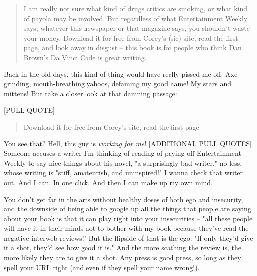 \begin{enumerate}
  
  \begin{quote}
  I am really not sure what kind of drugs critics are smoking, or
  what kind of payola may be involved. But regardless of what
  Entertainment Weekly says, whatever this newspaper or that magazine
  says, you shouldn't waste your money. Download it for free from
  Corey's (sic) site, read the first page, and look away in disgust
  -- this book is for people who think Dan Brown's Da Vinci Code is
  great writing.
  \end{quote}
  
  Back in the old days, this kind of thing would have really pissed
  me off. Axe-grinding, mouth-breathing yahoos, defaming my good
  name! My stars and mittens! But take a closer look at that damning
  passage:
  
  [PULL-QUOTE]
  
  \begin{quote}
  Download it for free from Corey's site, read the first page
  \end{quote}
  
  You see that? Hell, this guy is \emph{working for me}!
  [ADDITIONAL PULL QUOTES] Someone accuses a writer I'm thinking of
  reading of paying off Entertainment Weekly to say nice things about
  his novel, "a surprisingly bad writer," no less, whose writing is
  "stiff, amateurish, and uninspired!" I wanna check that writer out.
  And I can. In one click. And then I can make up my own mind.
  
  You don't get far in the arts without healthy doses of both ego and
  insecurity, and the downside of being able to google up all the
  things that people are saying about your book is that it can play
  right into your insecurities -- "all these people will have it in
  their minds not to bother with my book because they've read the
  negative interweb reviews!" But the flipside of that is the ego:
  "If only they'd give it a shot, they'd see how good it is." And the
  more scathing the review is, the more likely they are to give it a
  shot. Any press is good press, so long as they spell your URL right
  (and even if they spell your name wrong!).
  

\end{enumerate}
